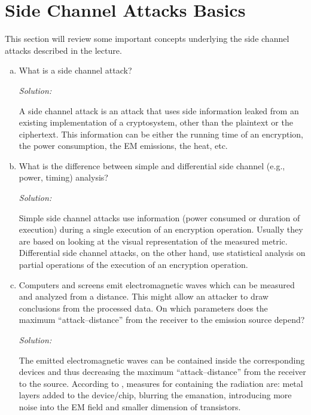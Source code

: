 \documentclass[a4paper,11pt]{article}
\newcommand{\includeonlyinsolution}[1]{\ifsolution#1\fi}
\newenvironment{solution}%
{\par{\noindent\small\textit{Solution:}}\vspace{-12pt}\begin{framed}}%
{\end{framed}\par}
\begin{document}
\section{Side Channel Attacks Basics}
This section will review some important concepts underlying the side channel
attacks described in the lecture.
\begin{enumerate}[(a)]
\item What is a side channel attack?
\includeonlyinsolution{\begin{solution}
A side channel attack is an attack that uses side information leaked from an
existing implementation of a cryptosystem, other than the plaintext or the ciphertext.
This information can be either the running time of an encryption, the power consumption,
the EM emissions, the heat, etc.
\end{solution}}
\item What is the difference between simple and differential side channel
  (e.g., power, timing) analysis?
\includeonlyinsolution{\begin{solution}
Simple side channel attacks use information (power consumed or duration of execution)
during a single execution of an encryption operation. Usually they are based on looking at
the visual representation of the measured metric.\\
Differential side channel attacks, on the other hand, use statistical analysis
on partial operations of the execution of an encryption operation.
\end{solution}}

\item Computers and screens emit electromagnetic waves which can be measured and
analyzed from a distance. This might allow an attacker to draw conclusions from the
processed data. On which parameters does the maximum ``attack--distance'' from the
receiver to the emission source depend?
\includeonlyinsolution{\begin{solution}
The emitted electromagnetic waves can be contained inside the corresponding devices
and thus decreasing the maximum ``attack--distance'' from the receiver to the source.
According to \cite{AttacksOnSmartcards}, measures for containing the radiation are:
metal layers added to the device/chip, blurring the emanation, introducing more
noise into the EM field and smaller dimension of transistors.
\end{solution}}


\end{enumerate}
\end{document}
